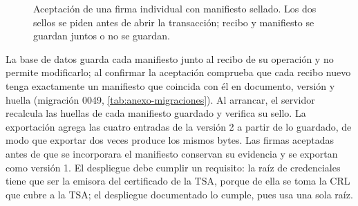 \begin{figure}[!tb]
  \centering
  
  \caption{Aceptación de una firma individual con manifiesto sellado. Los dos sellos se piden antes de abrir la transacción; recibo y manifiesto se guardan juntos o no se guardan.}
  \label{fig:impl-manifiesto-aceptacion}
\end{figure}

La base de datos guarda cada manifiesto junto al recibo de su operación y no permite modificarlo; al confirmar la aceptación comprueba que cada recibo nuevo tenga exactamente un manifiesto que coincida con él en documento, versión y huella (migración 0049, \cref{tab:anexo-migraciones}). Al arrancar, el servidor recalcula las huellas de cada manifiesto guardado y verifica su sello. La exportación agrega las cuatro entradas de la versión 2 a partir de lo guardado, de modo que exportar dos veces produce los mismos bytes. Las firmas aceptadas antes de que se incorporara el manifiesto conservan su evidencia y se exportan como versión 1. El despliegue debe cumplir un requisito: la raíz de credenciales tiene que ser la emisora del certificado de la TSA, porque de ella se toma la CRL que cubre a la TSA; el despliegue documentado lo cumple, pues usa una sola raíz.

